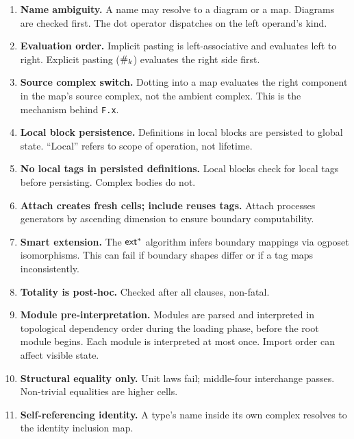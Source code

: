 \documentclass[acmsmall,screen,nonacm]{acmart}
\begin{document}
\begin{enumerate}
  \item \textbf{Name ambiguity.} A name may resolve to a diagram or a
    map. Diagrams are checked first. The dot operator dispatches on the
    left operand's kind.

  \item \textbf{Evaluation order.} Implicit pasting is left-associative
    and evaluates left to right.
    Explicit pasting ($\mathbin{\#_{k}}$) evaluates the right side first.

  \item \textbf{Source complex switch.} Dotting into a map evaluates the
    right component in the map's source complex, not the ambient complex.
    This is the mechanism behind \texttt{F.x}.

  \item \textbf{Local block persistence.} Definitions in local blocks are
    persisted to global state. ``Local'' refers to scope of operation, not
    lifetime.

  \item \textbf{No local tags in persisted definitions.} Local blocks
    check for local tags before persisting. Complex bodies do not.

  \item \textbf{Attach creates fresh cells; include reuses tags.} Attach
    processes generators by ascending dimension to ensure boundary
    computability.

  \item \textbf{Smart extension.} The $\mathsf{ext}^{*}$ algorithm infers
    boundary mappings via ogposet isomorphisms. This can fail if boundary
    shapes differ or if a tag maps inconsistently.

  \item \textbf{Totality is post-hoc.} Checked after all clauses,
    non-fatal.

  \item \textbf{Module pre-interpretation.} Modules are parsed and
    interpreted in topological dependency order during the loading phase,
    before the root module begins. Each module is interpreted at most once.
    Import order can affect visible state.

  \item \textbf{Structural equality only.} Unit laws fail; middle-four
    interchange passes. Non-trivial equalities are higher cells.

  \item \textbf{Self-referencing identity.} A type's name inside its own
    complex resolves to the identity inclusion map.


\end{enumerate}
\end{document}

